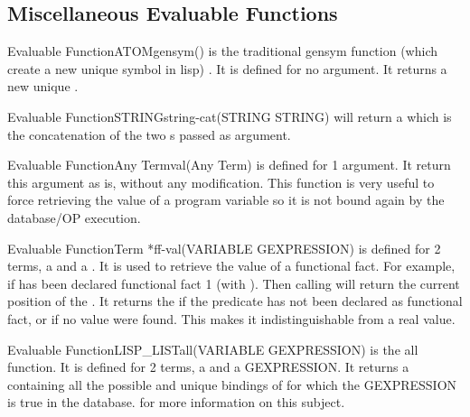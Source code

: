 \subsection{Miscellaneous Evaluable Functions}

\begin{typeefa}{Evaluable Function}{ATOM}{gensym}{()}
is the traditional gensym function (which create a new unique symbol in lisp) .
It is defined for no argument. It returns a new unique .
\end{typeefa}

\begin{typeefa}{Evaluable Function}{STRING}{string-cat}{(STRING STRING)} 
will return a  which is the concatenation of the two
s passed as argument.
\end{typeefa}

\begin{typeefa}{Evaluable Function}{Any Term}{val}{(Any Term)}
is defined for 1 argument. It return this argument as is, without any
modification. This function is very useful to force retrieving the value of a
program variable so it is not bound again by the database/OP execution.
\end{typeefa}

\begin{typeefa}{Evaluable Function}{Term *}{ff-val}{(VARIABLE GEXPRESSION)}
is defined for 2 terms, a  and a . It is used
to retrieve the value of a functional fact.  For example, if 
has been declared functional fact 1 (with ).  Then
calling  will return the current
 position of the .  It returns the 
 if the predicate has not been declared as functional 
fact, or if no value were found. This makes it indistinguishable from a
 real value.
\end{typeefa}

\begin{typeefa}{Evaluable Function}{LISP\_LIST}{all}{(VARIABLE GEXPRESSION)}
is the all function. It is defined for 2 terms, a  and a
GEXPRESSION.  It returns a  containing all the possible and
unique bindings of  for which the GEXPRESSION is true in the
database.  for more information on
this subject.
\end{typeefa}

